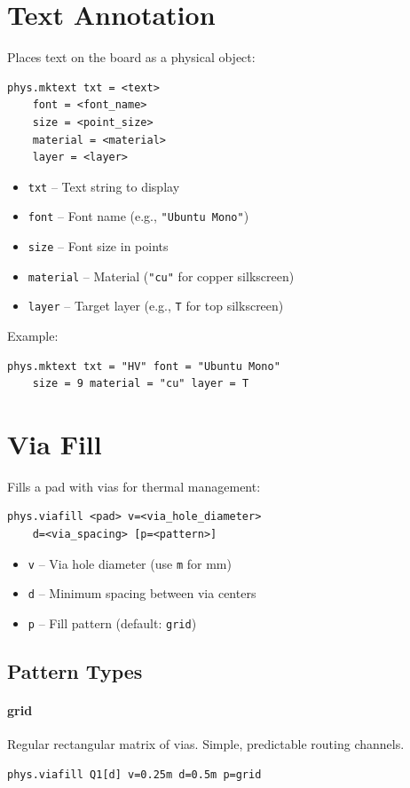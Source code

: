 \documentclass{report}
\begin{document}
\section{Text Annotation}
Places text on the board as a physical object:
\begin{verbatim}
phys.mktext txt = <text> 
    font = <font_name> 
    size = <point_size> 
    material = <material> 
    layer = <layer>
\end{verbatim}
\begin{itemize}
\item \texttt{txt} -- Text string to display
\item \texttt{font} -- Font name (e.g., \texttt{"Ubuntu Mono"})
\item \texttt{size} -- Font size in points
\item \texttt{material} -- Material (\texttt{"cu"} for copper silkscreen)
\item \texttt{layer} -- Target layer (e.g., \texttt{T} for top silkscreen)
\end{itemize}

Example:
\begin{verbatim}
phys.mktext txt = "HV" font = "Ubuntu Mono" 
    size = 9 material = "cu" layer = T
\end{verbatim}

\section{Via Fill}
Fills a pad with vias for thermal management:
\begin{verbatim}
phys.viafill <pad> v=<via_hole_diameter> 
    d=<via_spacing> [p=<pattern>]
\end{verbatim}
\begin{itemize}
\item \texttt{v} -- Via hole diameter (use \texttt{m} for mm)
\item \texttt{d} -- Minimum spacing between via centers
\item \texttt{p} -- Fill pattern (default: \texttt{grid})
\end{itemize}

\subsection{Pattern Types}

\paragraph{grid}
Regular rectangular matrix of vias. Simple, predictable routing channels.
\begin{verbatim}
phys.viafill Q1[d] v=0.25m d=0.5m p=grid
\end{verbatim}
\end{document}
